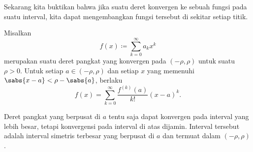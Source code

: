Sekarang kita buktikan bahwa jika suatu deret konvergen ke sebuah fungsi
pada suatu interval, kita dapat mengembangkan fungsi tersebut di sekitar setiap titik.

\begin{thm}
%
\label{thm:tayloranal}
Misalkan
\begin{equation*}
f(x) \coloneqq \sum_{k=0}^\infty a_k x^k
\end{equation*}
merupakan suatu deret pangkat yang konvergen pada $(-\rho,\rho)$ untuk suatu $\rho > 0$.  Untuk setiap $a \in
(-\rho,\rho)$
dan setiap $x$ yang memenuhi $\sabs{x-a} < \rho-\sabs{a}$, berlaku
\begin{equation*}
f(x) =
\sum_{k=0}^\infty \frac{f^{(k)}(a)}{k!} {(x-a)}^{k} .
\end{equation*}
\end{thm}

Deret pangkat yang berpusat di $a$ tentu saja dapat konvergen pada interval yang lebih besar, tetapi
konvergensi pada interval di atas dijamin.  Interval tersebut adalah interval simetris terbesar yang berpusat di
$a$ dan termuat dalam $(-\rho,\rho)$.

